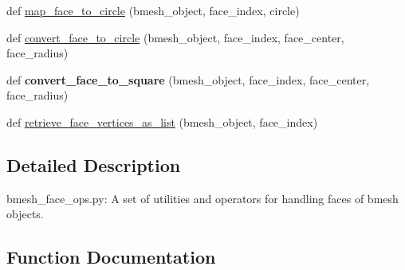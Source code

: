 \begin{DoxyCompactItemize}
\item 
def \hyperlink{namespacemeshy_1_1neuromorphovis_1_1bmeshi_1_1ops_1_1bmesh__face__ops_ac39c6aff168b6108a7098b644e8abe90}{map\+\_\+face\+\_\+to\+\_\+circle} (bmesh\+\_\+object, face\+\_\+index, circle)
\item 
def \hyperlink{namespacemeshy_1_1neuromorphovis_1_1bmeshi_1_1ops_1_1bmesh__face__ops_addfff7720481a30c87ab51d25238c00b}{convert\+\_\+face\+\_\+to\+\_\+circle} (bmesh\+\_\+object, face\+\_\+index, face\+\_\+center, face\+\_\+radius)
\item 
def {\bfseries convert\+\_\+face\+\_\+to\+\_\+square} (bmesh\+\_\+object, face\+\_\+index, face\+\_\+center, face\+\_\+radius)\hypertarget{namespacemeshy_1_1neuromorphovis_1_1bmeshi_1_1ops_1_1bmesh__face__ops_a16f9a789431667bd61a326c831163bd9}{}\label{namespacemeshy_1_1neuromorphovis_1_1bmeshi_1_1ops_1_1bmesh__face__ops_a16f9a789431667bd61a326c831163bd9}

\item 
def \hyperlink{namespacemeshy_1_1neuromorphovis_1_1bmeshi_1_1ops_1_1bmesh__face__ops_a2c69841a9849f268a4444571ddc84ebb}{retrieve\+\_\+face\+\_\+vertices\+\_\+as\+\_\+list} (bmesh\+\_\+object, face\+\_\+index)
\end{DoxyCompactItemize}


\subsection{Detailed Description}
\begin{DoxyVerb}bmesh_face_ops.py:
A set of utilities and operators for handling faces of bmesh objects.
\end{DoxyVerb}
 

\subsection{Function Documentation}

